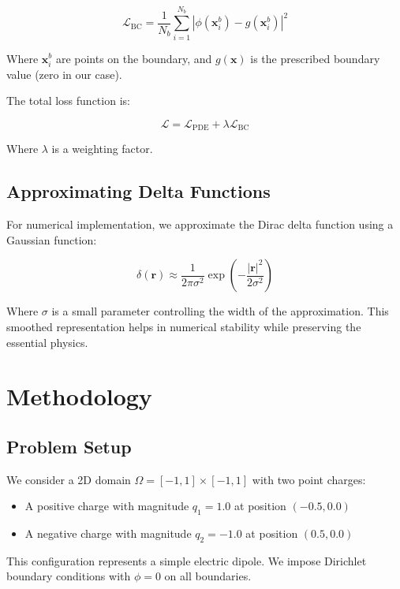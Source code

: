 \documentclass[12pt,a4paper]{report}
\begin{document}
	\begin{equation}
		\mathcal{L}_{\text{BC}} = \frac{1}{N_b} \sum_{i=1}^{N_b} \left| \phi(\mathbf{x}_i^b) - g(\mathbf{x}_i^b) \right|^2
	\end{equation}
	
	Where $\mathbf{x}_i^b$ are points on the boundary, and $g(\mathbf{x})$ is the prescribed boundary value (zero in our case).
	
	The total loss function is:
	
	\begin{equation}
		\mathcal{L} = \mathcal{L}_{\text{PDE}} + \lambda \mathcal{L}_{\text{BC}}
	\end{equation}
	
	Where $\lambda$ is a weighting factor.
	
	\section{Approximating Delta Functions}
	For numerical implementation, we approximate the Dirac delta function using a Gaussian function:
	
	\begin{equation}
		\delta(\mathbf{r}) \approx \frac{1}{2\pi\sigma^2} \exp\left(-\frac{|\mathbf{r}|^2}{2\sigma^2}\right)
	\end{equation}
	
	Where $\sigma$ is a small parameter controlling the width of the approximation. This smoothed representation helps in numerical stability while preserving the essential physics.
	
	\chapter{Methodology}
	
	\section{Problem Setup}
	We consider a 2D domain $\Omega = [-1, 1] \times [-1, 1]$ with two point charges:
	\begin{itemize}
		\item A positive charge with magnitude $q_1 = 1.0$ at position $(-0.5, 0.0)$
		\item A negative charge with magnitude $q_2 = -1.0$ at position $(0.5, 0.0)$
	\end{itemize}
	
	This configuration represents a simple electric dipole. We impose Dirichlet boundary conditions with $\phi = 0$ on all boundaries.
	
\end{document}
